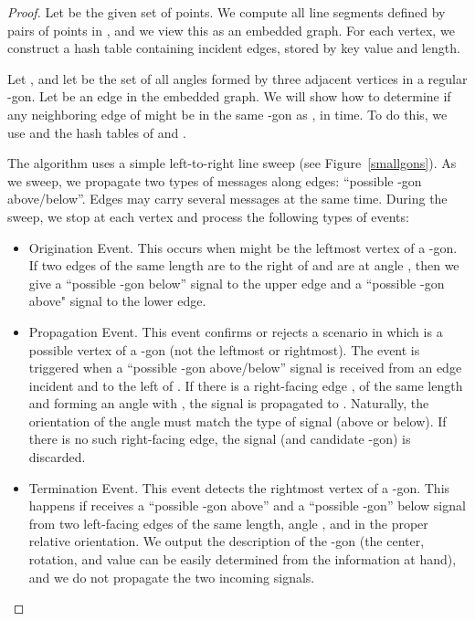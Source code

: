 \documentclass{article}
\begin{document}
\begin{proof}
Let  be the given set of  points.
We compute all line segments defined by pairs of points in , and we
view this as an embedded graph. 
For each vertex, we construct a hash table 
containing incident edges, stored by key value and length.




Let , and let  be the set of all
angles formed by three adjacent vertices in a regular -gon. 
Let  be an edge in the embedded graph.
We will show how to determine if any neighboring edge of  might be
in the same -gon as , in   time.
To do this, we use  and the hash tables of  and . 


The algorithm uses a simple left-to-right line sweep (see Figure~\ref{smallgons}). As we sweep, 
we propagate two types of messages along edges: ``possible
-gon above/below''.
Edges may carry several messages at the same time.
During the sweep, we stop at each vertex  and 
process the following types of events:

\begin{itemize}
\item {Origination Event.} This occurs when  might be the leftmost
vertex of a -gon. If two edges of the same length are to the right of
 and are at angle , then we give a ``possible -gon
below'' signal to the upper edge and a ``possible -gon above" signal to the
lower edge. 

\item {Propagation Event.}
This event confirms or rejects a scenario in which  is a possible vertex of a
-gon (not the leftmost or rightmost).
The event is triggered when a ``possible -gon above/below'' signal is
received from an edge  incident and to the left of .
If there is a right-facing edge , of the
same length and forming an angle  with , 
the signal is propagated to .  Naturally, the
orientation of the angle must match the type of signal (above or below). 
If there is no such right-facing edge, the
signal (and candidate -gon) is discarded.

\item {Termination Event.} This event detects the rightmost
vertex of a -gon. This happens if  receives a
``possible -gon above'' and a ``possible -gon'' below signal
from two left-facing edges of the same length, angle , and
in the proper relative orientation.
We output the description of the -gon (the center, rotation, and value  can
be easily determined from the information at hand), and we do not propagate
the two incoming signals.
\end{itemize}



\end{proof}
\end{document}
